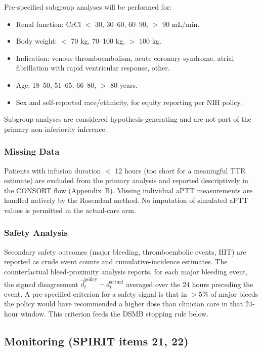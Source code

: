 \documentclass[11pt]{article}
\begin{document}
Pre-specified subgroup analyses will be performed for:
\begin{itemize}
  \item Renal function: CrCl $<$ 30, 30--60, 60--90, $>$ 90 mL/min.
  \item Body weight: $<$ 70 kg, 70--100 kg, $>$ 100 kg.
  \item Indication: venous thromboembolism, acute coronary syndrome, atrial fibrillation with rapid ventricular response, other.
  \item Age: 18--50, 51--65, 66--80, $>$ 80 years.
  \item Sex and self-reported race/ethnicity, for equity reporting per NIH policy.
\end{itemize}

Subgroup analyses are considered hypothesis-generating and are not part of the primary non-inferiority inference.

\subsubsection{Missing Data}

Patients with infusion duration $<$ 12 hours (too short for a meaningful TTR estimate) are excluded from the primary analysis and reported descriptively in the CONSORT flow (Appendix~B). Missing individual aPTT measurements are handled natively by the Rosendaal method. No imputation of simulated aPTT values is permitted in the actual-care arm.

\subsubsection{Safety Analysis}

Secondary safety outcomes (major bleeding, thromboembolic events, HIT) are reported as crude event counts and cumulative-incidence estimates. The counterfactual bleed-proximity analysis reports, for each major bleeding event, the signed disagreement $\hat{d}_t^{\mathrm{policy}} - d_t^{\mathrm{actual}}$ averaged over the 24 hours preceding the event. A pre-specified criterion for a safety signal is that in $>5\%$ of major bleeds the policy would have recommended a higher dose than clinician care in that 24-hour window. This criterion feeds the DSMB stopping rule below.

\subsection{Monitoring (SPIRIT items 21, 22)}
\label{sec:monitoring}
\end{document}
